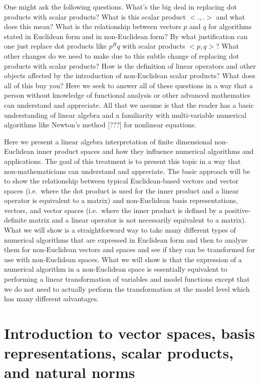 \documentclass[pdf,ps2pdf,11pt]{SANDreport}
\begin{document}
One might ask the following questions.  What's the big deal in replacing dot
products with scalar products?  What is this scalar product $<.,.>$ and what
does this mean?  What is the relationship between vectors $p$ and $q$ for
algorithms stated in Euclidean form and in non-Euclidean form?  By what
justification can one just replace dot products like $p^H q$ with scalar
products $<p,q>$?  What other changes do we need to make due to this subtle
change of replacing dot products with scalar products?  How is the definition
of linear operators and other objects affected by the introduction of
non-Euclidean scalar products?  What does all of this buy you?  Here we seek
to answer all of these questions in a way that a person without knowledge of
functional analysis or other advanced mathematics can understand and
appreciate.  All that we assume is that the reader has a basic understanding
of linear algebra and a familiarity with multi-variable numerical algorithms
like Newton's method [???] for nonlinear equations.

Here we present a linear algebra interpretation of finite dimensional
non-Euclidean inner product spaces and how they influence numerical algorithms
and applications.  The goal of this treatment is to present this topic in a
way that non-mathematicians can understand and appreciate.  The basic approach
will be to show the relationship between typical Euclidean-based vectors and
vector spaces (i.e.\ where the dot product is used for the inner product and a
linear operator is equivalent to a matrix) and non-Euclidean basis
representations, vectors, and vector spaces (i.e.\ where the inner product is
defined by a positive-definite matrix and a linear operator is not necessarily
equivalent to a matrix).  What we will show is a straightforward way to take
many different types of numerical algorithms that are expressed in Euclidean
form and then to analyze them for non-Euclidean vectors and spaces and see if
they can be transformed for use with non-Euclidean spaces.  What we will show
is that the expression of a numerical algorithm in a non-Euclidean space is
essentially equivalent to performing a linear transformation of variables and
model functions except that we do not need to actually perform the
transformation at the model level which has many different advantages.

\section{Introduction to vector spaces, basis representations, scalar products, and natural norms}
\end{document}
